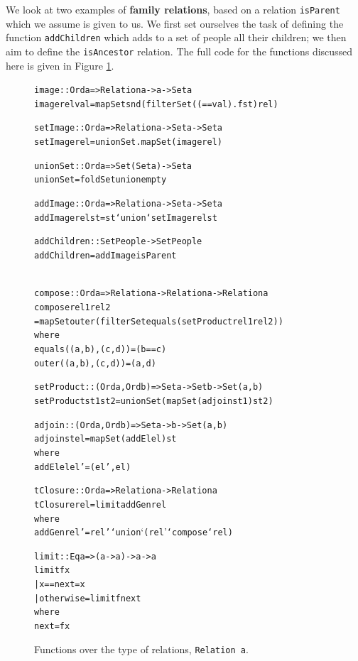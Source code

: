 We look at two examples of \textbf{family relations},
 based on a relation \texttt{isParent}
which we assume is given to us. We first set ourselves the task of defining the function
\texttt{addChildren} which adds to a set of people all their children; we then aim to define
the \texttt{isAncestor} relation. The full code for the functions discussed here is given in
Figure
\ref{relFuns}.
\begin{figure}
\begin{alltt}
image :: Ord a => Relation a -> a -> Set a
image rel val = mapSet snd (filterSet ((==val).fst) rel)
 
setImage :: Ord a => Relation a -> Set a -> Set a
setImage rel = unionSet . mapSet (image rel) 
 
unionSet :: Ord a => Set (Set a) -> Set a
unionSet = foldSet union empty

addImage :: Ord a => Relation a -> Set a -> Set a
addImage rel st = st `union` setImage rel st

addChildren :: Set People -> Set People
addChildren = addImage isParent 

\hspace*{0cm}\hrulefill\hspace*{0cm}\\

compose :: Ord a => Relation a -> Relation a -> Relation a
compose rel1 rel2
  =  mapSet outer (filterSet equals (setProduct rel1 rel2))
     where
     equals ((a,b),(c,d)) = (b==c)
     outer  ((a,b),(c,d)) = (a,d)
 
setProduct :: (Ord a,Ord b) => Set a -> Set b -> Set (a,b)
setProduct st1 st2 = unionSet (mapSet (adjoin st1) st2)
 
adjoin :: (Ord a,Ord b) => Set a -> b -> Set (a,b)
adjoin st el = mapSet (addEl el) st
               where
               addEl el el' = (el',el)
 
tClosure :: Ord a => Relation a -> Relation a
tClosure rel = limit addGen rel
               where
               addGen rel' = rel' `union` (rel' `compose` rel)

limit:: Eq a => (a -> a) -> a -> a
limit f x 
  | x == next     = x
  | otherwise     = limit f next
    where
    next = f x
\end{alltt}
\caption{Functions over the type of relations, \texttt{Relation a}.}
\label{relFuns}
\end{figure}

